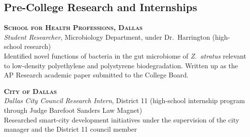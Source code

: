 \documentclass[11pt,letterpaper]{report} %
\begin{document}
    \subsection*{Pre-College Research and Internships}
    \begin{tablist}
        \item[2021--22] \tab{}\small{\textbf{\textsc{School for Health Professions, Dallas}}} \\[0.15em]
                              \textit{Student Researcher}, Microbiology Department, under Dr.~Harrington (high-school research) \\
                              Identified novel functions of bacteria in the gut microbiome of \textit{Z.\ atratus} relevant to low-density polyethylene and polystyrene biodegradation. Written up as the AP Research academic paper submitted to the College Board.
        \item[2021--22] \tab{}\small{\textbf{\textsc{City of Dallas}}} \\[0.15em]
                              \textit{Dallas City Council Research Intern}, District 11 (high-school internship program through Judge Barefoot Sanders Law Magnet) \\
                              Researched smart-city development initiatives under the supervision of the city manager and the District 11 council member
    \end{tablist}
\end{document}
